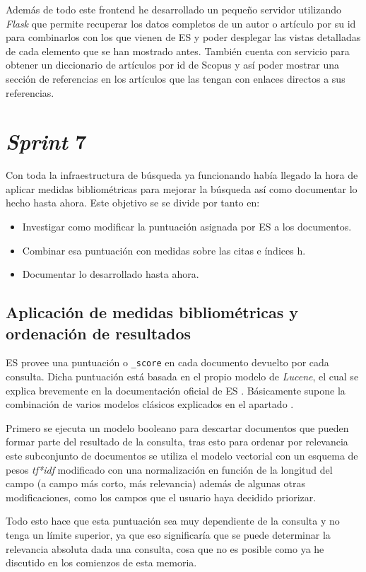 Además de todo este \gls{frontend} he desarrollado un pequeño servidor utilizando \textit{Flask} que permite recuperar los datos completos de un autor o artículo por su id para combinarlos con los que vienen de \acrshort{ES} y poder desplegar las vistas detalladas de cada elemento que se han mostrado antes. También cuenta con servicio para obtener un diccionario de artículos por id de Scopus y así poder mostrar una sección de referencias en los artículos que las tengan con enlaces directos a sus referencias.

\section{\textit{Sprint} 7}
Con toda la infraestructura de búsqueda ya funcionando había llegado la hora de aplicar medidas bibliométricas para mejorar la búsqueda así como documentar lo hecho hasta ahora. Este objetivo se se divide por tanto en:
\begin{itemize}
	\item Investigar como modificar la puntuación asignada por \acrshort{ES} a los documentos.
	\item Combinar esa puntuación con medidas sobre las citas e índices h.
	\item Documentar lo desarrollado hasta ahora.
\end{itemize}

\subsection{Aplicación de medidas bibliométricas y ordenación de resultados}
\acrlong{ES} provee una puntuación o \texttt{\_score} en cada documento devuelto por cada consulta. Dicha puntuación está basada en el propio modelo de \textit{Lucene}, el cual se explica brevemente en la documentación oficial de \acrshort{ES} \cite{ES_scoring}. Básicamente supone la combinación de varios modelos clásicos explicados en el apartado . 

Primero se ejecuta un modelo booleano para descartar documentos que pueden formar parte del resultado de la consulta, tras esto para ordenar por relevancia este subconjunto de documentos se utiliza el modelo vectorial con un esquema de pesos \textit{tf*idf} modificado con una normalización en función de la longitud del campo (a campo más corto, más relevancia) además de algunas otras modificaciones, como los campos que el usuario haya decidido priorizar.

Todo esto hace que esta puntuación sea muy dependiente de la consulta y no tenga un límite superior, ya que eso significaría que se puede determinar la relevancia absoluta dada una consulta, cosa que no es posible como ya he discutido en los comienzos de esta memoria. 

